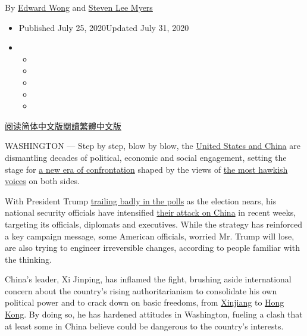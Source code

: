 By \href{https://www.nytimes.com/by/edward-wong}{Edward Wong} and
\href{https://www.nytimes.com/by/steven-lee-myers}{Steven Lee Myers}

\begin{itemize}
\item
  Published July 25, 2020Updated July 31, 2020
\item
  \begin{itemize}
  \item
  \item
  \item
  \item
  \item
  \end{itemize}
\end{itemize}

\href{https://cn.nytimes.com/china/20200727/us-china-trump-xi/}{阅读简体中文版}\href{https://cn.nytimes.com/china/20200727/us-china-trump-xi/zh-hant/}{閱讀繁體中文版}

WASHINGTON --- Step by step, blow by blow, the
\href{https://www.nytimes.com/2020/07/29/podcasts/the-daily/china-trump-foreign-policy.html}{United
States and China} are dismantling decades of political, economic and
social engagement, setting the stage for
\href{https://www.nytimes.com/2019/06/26/world/asia/united-states-china-conflict.html}{a
new era of confrontation} shaped by the views of
\href{https://www.nytimes.com/2020/07/14/world/asia/cold-war-china-us.html}{the
most hawkish voices} on both sides.

With President Trump
\href{https://www.nytimes.com/2020/07/24/upshot/biden-polls-demographics.html}{trailing
badly in the polls} as the election nears, his national security
officials have intensified
\href{https://www.nytimes.com/2020/03/22/us/politics/coronavirus-us-china.html}{their
attack on China} in recent weeks, targeting its officials, diplomats and
executives. While the strategy has reinforced a key campaign message,
some American officials, worried Mr. Trump will lose, are also trying to
engineer irreversible changes, according to people familiar with the
thinking.

China's leader, Xi Jinping, has inflamed the fight, brushing aside
international concern about the country's rising authoritarianism to
consolidate his own political power and to crack down on basic freedoms,
from
\href{https://www.nytimes.com/interactive/2019/11/16/world/asia/china-xinjiang-documents.html}{Xinjiang}
to
\href{https://www.nytimes.com/2020/06/29/world/asia/china-hong-kong-security-law-rules.html}{Hong
Kong}. By doing so, he has hardened attitudes in Washington, fueling a
clash that at least some in China believe could be dangerous to the
country's interests.

